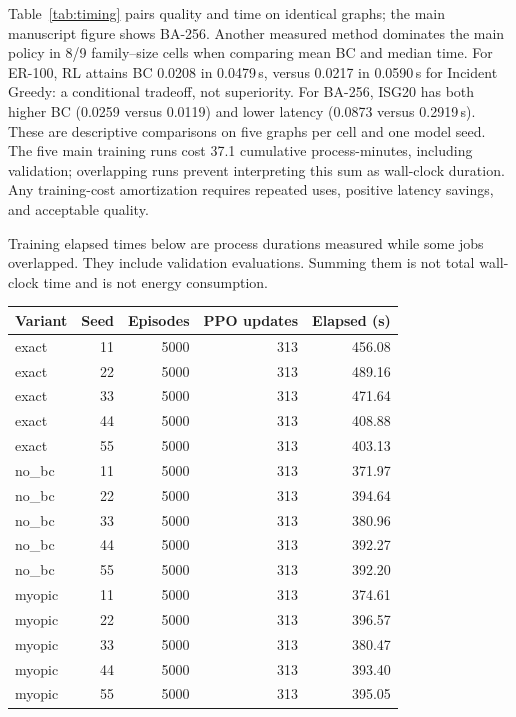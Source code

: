 \documentclass[11pt]{article}
\begin{document}
Table~\ref{tab:timing} pairs quality and time on identical graphs; the main manuscript figure shows BA-256. Another measured method dominates the main policy in 8/9 family--size cells when comparing mean BC and median time. For ER-100, RL attains BC 0.0208 in 0.0479\,s, versus 0.0217 in 0.0590\,s for Incident Greedy: a conditional tradeoff, not superiority. For BA-256, ISG20 has both higher BC (0.0259 versus 0.0119) and lower latency (0.0873 versus 0.2919\,s). These are descriptive comparisons on five graphs per cell and one model seed. The five main training runs cost 37.1 cumulative process-minutes, including validation; overlapping runs prevent interpreting this sum as wall-clock duration. Any training-cost amortization requires repeated uses, positive latency savings, and acceptable quality.

Training elapsed times below are process durations measured while some jobs
overlapped. They include validation evaluations. Summing them is not total
wall-clock time and is not energy consumption.
\begin{longtable}{lrrrr}
\toprule Variant & Seed & Episodes & PPO updates & Elapsed (s)\\ \midrule\endhead
exact & 11 & 5000 & 313 & 456.08\\
exact & 22 & 5000 & 313 & 489.16\\
exact & 33 & 5000 & 313 & 471.64\\
exact & 44 & 5000 & 313 & 408.88\\
exact & 55 & 5000 & 313 & 403.13\\
no\_bc & 11 & 5000 & 313 & 371.97\\
no\_bc & 22 & 5000 & 313 & 394.64\\
no\_bc & 33 & 5000 & 313 & 380.96\\
no\_bc & 44 & 5000 & 313 & 392.27\\
no\_bc & 55 & 5000 & 313 & 392.20\\
myopic & 11 & 5000 & 313 & 374.61\\
myopic & 22 & 5000 & 313 & 396.57\\
myopic & 33 & 5000 & 313 & 380.47\\
myopic & 44 & 5000 & 313 & 393.40\\
myopic & 55 & 5000 & 313 & 395.05\\
\bottomrule\end{longtable}
\end{document}
